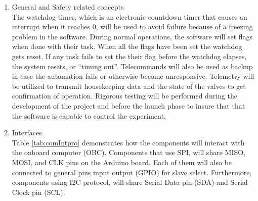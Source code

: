 \begin{enumerate}[label=(\alph*)]
\item{General and Safety related concepts}\\
The watchdog timer, which is an electronic countdown timer that causes an interrupt when it reaches 0, will be used to avoid failure because of a freezing problem in the software. During normal operations, the software will set flags when done with their task. When all the flags have been set the watchdog gets reset. If any task fails to set the their flag before the watchdog elapses, the system resets, or \enquote{timing out}. Telecommands will also be used as backup in case the automation fails or otherwise become unresponsive. Telemetry will be utilized to transmit housekeeping data and the state of the valves to get confirmation of operation. Rigorous testing will be performed during the development of the project and before the launch phase to insure that that the software is capable to control the experiment.
\item{Interfaces}\\
Table \ref{tab:comIntpro} demonstrates how the components will interact with the onboard computer (OBC). Components that use SPI, will share MISO, MOSI, and CLK pins on the Arduino board. Each of them will also be connected to general pins input output (GPIO) for slave select. Furthermore, components using I2C protocol, will share Serial Data pin (SDA) and Serial Clock pin (SCL).




\end{enumerate}

